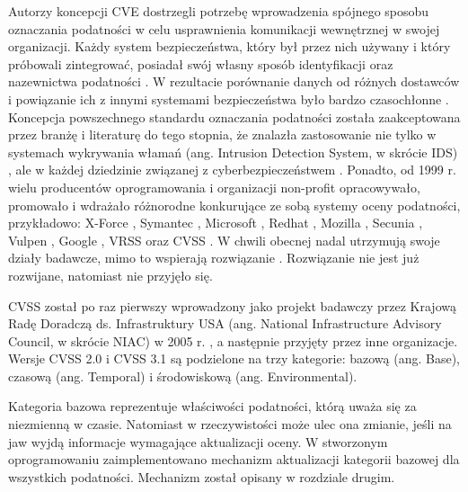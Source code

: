 \bigbreak
Autorzy koncepcji CVE dostrzegli potrzebę wprowadzenia spójnego sposobu oznaczania podatności w celu usprawnienia komunikacji wewnętrznej w swojej organizacji. Każdy system bezpieczeństwa, który był przez nich używany i który próbowali zintegrować, posiadał swój własny sposób identyfikacji oraz nazewnictwa podatności \cite{mann1999towards, martin2001managing, fall2019common}. W rezultacie porównanie danych od różnych dostawców i powiązanie ich z innymi systemami bezpieczeństwa było bardzo czasochłonne \cite{mann1999towards, fall2019common}. Koncepcja powszechnego standardu oznaczania podatności została zaakceptowana przez branżę i literaturę do tego stopnia, że znalazła zastosowanie nie tylko w systemach wykrywania włamań (ang. Intrusion Detection System, w skrócie IDS) \cite{mell2003overview}, ale w każdej dziedzinie związanej z cyberbezpieczeństwem \cite{kaya2019study, food2016postmarket, wang2018mining}. Ponadto, od 1999 r. wielu producentów oprogramowania i organizacji non-profit opracowywało, promowało i wdrażało różnorodne konkurujące ze sobą systemy oceny podatności, przykładowo: X-Force \cite{ibmxforce}, Symantec \cite{broadcom-2020}, Microsoft \cite{msrc-2020}, Redhat \cite{Redhat-2020}, Mozilla \cite{mozilla-2020}, Secunia \cite{secunia-2020}, Vulpen  \cite{liu2012improving}, Google \cite{chromium-2020}, VRSS \cite{liu2012improving} oraz CVSS \cite{mell2006common}. W chwili obecnej \cite{ibmxforce, broadcom-2020, msrc-2020, Redhat-2020, mozilla-2020, chromium-2020} nadal utrzymują swoje działy badawcze, mimo to wspierają rozwiązanie \cite{mell2006common}. Rozwiązanie \cite{secunia-2020} nie jest już rozwijane, natomiast \cite{liu2012improving} nie przyjęło się.

\bigbreak
CVSS został po raz pierwszy wprowadzony jako projekt badawczy przez Krajową Radę Doradczą ds. Infrastruktury USA (ang. National Infrastructure Advisory Council, w skrócie NIAC) w 2005 r. \cite{mell2006common}, a następnie przyjęty przez inne organizacje. Wersje CVSS 2.0 i CVSS 3.1 \cite{cvs2005specification, cvs2019specification} są podzielone na trzy kategorie: bazową (ang. Base), czasową (ang. Temporal) i środowiskową (ang. Environmental).

\bigbreak
Kategoria bazowa reprezentuje właściwości podatności, którą uważa się za niezmienną w czasie. Natomiast w rzeczywistości może ulec ona zmianie, jeśli na jaw wyjdą informacje wymagające aktualizacji oceny. W stworzonym oprogramowaniu zaimplementowano mechanizm aktualizacji kategorii bazowej dla wszystkich podatności. Mechanizm został opisany w rozdziale drugim.

